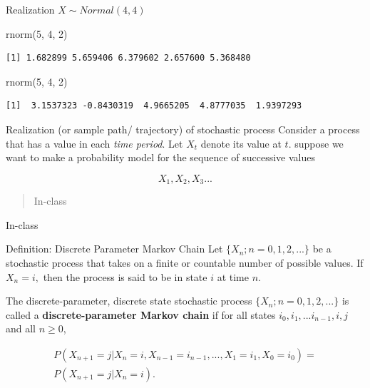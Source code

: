 \documentclass[12pt,ignorenonframetext,]{beamer}
\newenvironment{Shaded}{\begin{snugshade}}{\end{snugshade}}
\newcommand{\DecValTok}[1]{\textcolor[rgb]{0.00,0.00,0.81}{#1}}
\newcommand{\FunctionTok}[1]{\textcolor[rgb]{0.00,0.00,0.00}{#1}}
\newcommand{\NormalTok}[1]{#1}
\begin{document}
\begin{frame}[fragile]{Realization}
\protect\hypertarget{realization}{}
\(X \sim Normal(4, 4)\)

\begin{Shaded}
\begin{Highlighting}[]
\FunctionTok{rnorm}\NormalTok{(}\DecValTok{5}\NormalTok{, }\DecValTok{4}\NormalTok{, }\DecValTok{2}\NormalTok{)}
\end{Highlighting}
\end{Shaded}

\begin{verbatim}
[1] 1.682899 5.659406 6.379602 2.657600 5.368480
\end{verbatim}

\begin{Shaded}
\begin{Highlighting}[]
\FunctionTok{rnorm}\NormalTok{(}\DecValTok{5}\NormalTok{, }\DecValTok{4}\NormalTok{, }\DecValTok{2}\NormalTok{)}
\end{Highlighting}
\end{Shaded}

\begin{verbatim}
[1]  3.1537323 -0.8430319  4.9665205  4.8777035  1.9397293
\end{verbatim}
\end{frame}

\begin{frame}{Realization (or sample path/ trajectory) of stochastic
process}
\protect\hypertarget{realization-or-sample-path-trajectory-of-stochastic-process}{}
Consider a process that has a value in each \emph{time period}. Let
\(X_t\) denote its value at \(t\). suppose we want to make a probability
model for the sequence of successive values

\[X_1,X_2,X_3 . . .\]

\begin{quote}
In-class
\end{quote}
\end{frame}

\begin{frame}{In-class}
\protect\hypertarget{in-class-1}{}
\end{frame}

\begin{frame}{Definition: Discrete Parameter Markov Chain}
\protect\hypertarget{definition-discrete-parameter-markov-chain}{}
Let \(\{X_n; n = 0, 1, 2, ...\}\) be a stochastic process that takes on
a finite or countable number of possible values. If \(X_n=i,\) then the
process is said to be in state \(i\) at time \(n\).

The discrete-parameter, discrete state stochastic process
\(\{X_n; n=0, 1, 2,...\}\) is called a \textbf{discrete-parameter Markov
chain} if for all states \(i_0, i_1,...i_{n-1}, i, j\) and all
\(n \geq 0\),

\begin{multline}
  P(X_{n+1}=j|X_n=i, X_{n-1}=i_{n-1}, ..., X_1=i_1, X_0=i_0) = \\  P(X_{n+1}=j|X_n=i).
\end{multline}
\end{frame}
\end{document}
